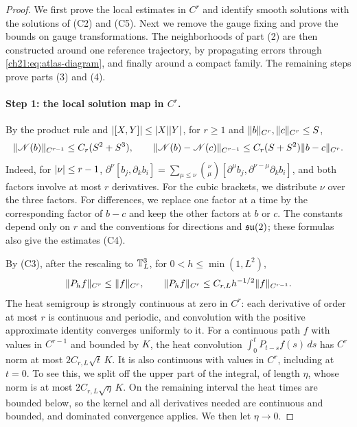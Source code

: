 \begin{proof}
We first prove the local estimates in $C^r$ and identify smooth solutions with the solutions of (C2) and (C5). Next we remove the gauge fixing and prove the bounds on gauge transformations. The neighborhoods of part (2) are then constructed around one reference trajectory, by propagating errors through \eqref{ch21:eq:atlas-diagram}, and finally around a compact family. The remaining steps prove parts (3) and (4).

\paragraph{Step 1: the local solution map in $C^r$.}
By the product rule and $\lvert [X,Y]\rvert\le\lvert X\rvert\lvert Y\rvert$, for $r\ge1$ and $\lVert b\rVert_{C^r},\lVert c\rVert_{C^r}\le S$,
\begin{equation}\label{ch21:eq:continuum-nonlinearity}
 \lVert \mathscr N(b)\rVert_{C^{r-1}}\le C_r(S^2+S^3),\qquad
 \lVert \mathscr N(b)-\mathscr N(c)\rVert_{C^{r-1}}\le C_r(S+S^2)\lVert b-c\rVert_{C^r}.
\end{equation}
Indeed, for $\lvert \nu\rvert\le r-1$, $\partial^\nu[b_j,\partial_kb_i]=\sum_{\mu\le\nu}\binom\nu\mu[\partial^\mu b_j,\partial^{\nu-\mu}\partial_kb_i]$, and both factors involve at most $r$ derivatives. For the cubic brackets, we distribute $\nu$ over the three factors. For differences, we replace one factor at a time by the corresponding factor of $b-c$ and keep the other factors at $b$ or $c$. The constants depend only on $r$ and the conventions for directions and $\mathfrak{su}(2)$; these formulas also give the estimates (C4).

By (C3), after the rescaling to $\mathbb T_L^3$, for $0<h\le\min(1,L^2)$,
\[
 \lVert P_hf\rVert_{C^r}\le\lVert f\rVert_{C^r},\qquad\lVert P_hf\rVert_{C^r}\le C_{r,L}h^{-1/2}\lVert f\rVert_{C^{r-1}} .
\]
The heat semigroup is strongly continuous at zero in $C^r$: each derivative of order at most $r$ is continuous and periodic, and convolution with the positive approximate identity converges uniformly to it. For a continuous path $f$ with values in $C^{r-1}$ and bounded by $K$, the heat convolution $\int_0^tP_{t-s}f(s)\,ds$ has $C^r$ norm at most $2C_{r,L}\sqrt t\,K$. It is also continuous with values in $C^r$, including at $t=0$. To see this, we split off the upper part of the integral, of length $\eta$, whose norm is at most $2C_{r,L}\sqrt\eta\,K$. On the remaining interval the heat times are bounded below, so the kernel and all derivatives needed are continuous and bounded, and dominated convergence applies. We then let $\eta\to0$.


\end{proof}
